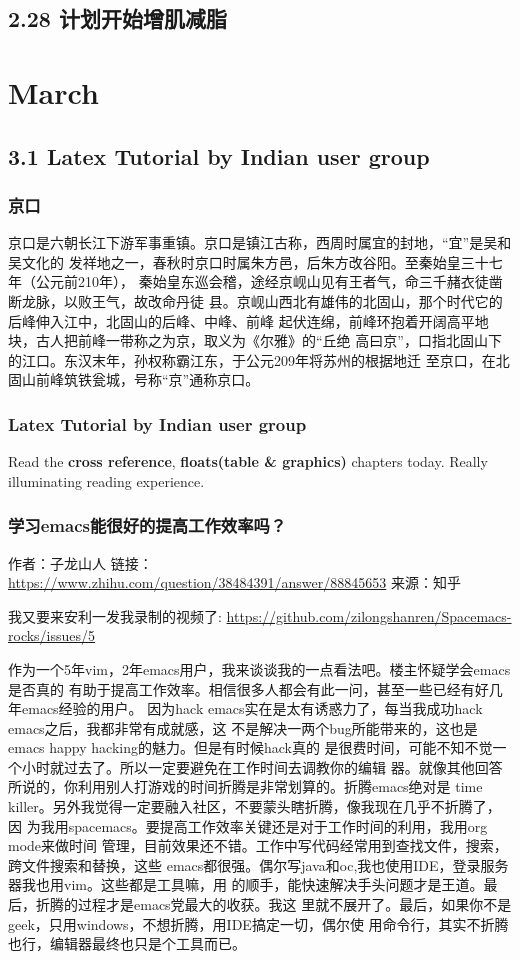 \documentclass[11pt]{article}
\begin{document}
\subsection*{2.28 计划开始增肌减脂}
\label{sec:orgheadline123}
\section*{March}
\label{sec:orgheadline183}
\subsection*{3.1 Latex Tutorial by Indian user group}
\label{sec:orgheadline128}
\subsubsection*{京口}
\label{sec:orgheadline125}
京口是六朝长江下游军事重镇。京口是镇江古称，西周时属宜的封地，“宜”是吴和吴文化的
发祥地之一，春秋时京口时属朱方邑，后朱方改谷阳。至秦始皇三十七年（公元前210年），
秦始皇东巡会稽，途经京岘山见有王者气，命三千赭衣徒凿断龙脉，以败王气，故改命丹徒
县。京岘山西北有雄伟的北固山，那个时代它的后峰伸入江中，北固山的后峰、中峰、前峰
起伏连绵，前峰环抱着开阔高平地块，古人把前峰一带称之为京，取义为《尔雅》的“丘绝
高曰京”，口指北固山下的江口。东汉末年，孙权称霸江东，于公元209年将苏州的根据地迁
至京口，在北固山前峰筑铁瓮城，号称“京”通称京口。
\subsubsection*{Latex Tutorial by Indian user group}
\label{sec:orgheadline126}
Read the \textbf{cross reference}, \textbf{floats(table \& graphics)} chapters today. Really illuminating reading experience.
\subsubsection*{学习emacs能很好的提高工作效率吗？}
\label{sec:orgheadline127}
作者：子龙山人
链接：\url{https://www.zhihu.com/question/38484391/answer/88845653}
来源：知乎

我又要来安利一发我录制的视频了: \url{https://github.com/zilongshanren/Spacemacs-rocks/issues/5}

作为一个5年vim，2年emacs用户，我来谈谈我的一点看法吧。楼主怀疑学会emacs是否真的
有助于提高工作效率。相信很多人都会有此一问，甚至一些已经有好几年emacs经验的用户。
因为hack emacs实在是太有诱惑力了，每当我成功hack emacs之后，我都非常有成就感，这
不是解决一两个bug所能带来的，这也是emacs happy hacking的魅力。但是有时候hack真的
是很费时间，可能不知不觉一个小时就过去了。所以一定要避免在工作时间去调教你的编辑
器。就像其他回答所说的，你利用别人打游戏的时间折腾是非常划算的。折腾emacs绝对是
time killer。另外我觉得一定要融入社区，不要蒙头瞎折腾，像我现在几乎不折腾了，因
为我用spacemacs。要提高工作效率关键还是对于工作时间的利用，我用org mode来做时间
管理，目前效果还不错。工作中写代码经常用到查找文件，搜索，跨文件搜索和替换，这些
emacs都很强。偶尔写java和oc,我也使用IDE，登录服务器我也用vim。这些都是工具嘛，用
的顺手，能快速解决手头问题才是王道。最后，折腾的过程才是emacs党最大的收获。我这
里就不展开了。最后，如果你不是geek，只用windows，不想折腾，用IDE搞定一切，偶尔使
用命令行，其实不折腾也行，编辑器最终也只是个工具而已。
\end{document}
